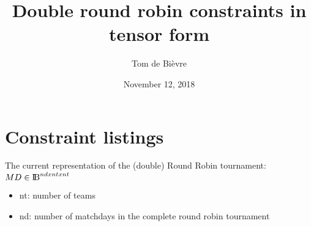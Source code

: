 \documentclass[titlepage]{article}%
\title{Double round robin constraints in tensor form}
\date{November 12, 2018}
\author{Tom de Bièvre}
\begin{document}
\maketitle
\section*{Constraint listings}
The current representation of the (double) Round Robin tournament: ${MD \in \rm I\!B}^{nd x nt x nt}$\\

\begin{itemize}  
	\item nt: number of teams
	\item nd: number of matchdays in the complete round robin tournament
\end{itemize}
\end{document}
